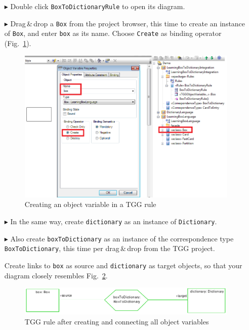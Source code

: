 \begin{enumerate}
\item[$\blacktriangleright$] Double click \texttt{BoxToDictionaryRule} to open its diagram.

\item[$\blacktriangleright$] Drag\,\&\,drop a \texttt{Box} from the project browser, this time to create an instance of \texttt{Box}, and enter \texttt{box} as its name.
Choose \texttt{Create} as binding operator (Fig.~\ref{fig:create_tgg_object}).

\begin{figure}[htbp]
\begin{center}
  \includegraphics[width=\textwidth]{pics/tggBilder/tggRule/tgg10}
  \caption{Creating an object variable in a TGG rule}  
  \label{fig:create_tgg_object}
\end{center}
\end{figure}

\item[$\blacktriangleright$] In the same way, create \texttt{dictionary} as an instance of \texttt{Dictionary}.

\item[$\blacktriangleright$] Also create \texttt{boxToDictionary} as an instance of the correspondence type \texttt{BoxToDictionary}, this time per drag\,\&\,drop from the TGG project.

Create links to \texttt{box} as source and \texttt{dictionary} as target objects, so that your diagram closely resembles Fig.~\ref{fig:first_rule_diagram}.

\begin{figure}[htbp]
\begin{center}
  \includegraphics[width=\textwidth]{pics/tggBilder/tggRule/tgg11}
  \caption{TGG rule after creating and connecting all object variables}  
  \label{fig:first_rule_diagram}
\end{center}
\end{figure}
\end{enumerate}

